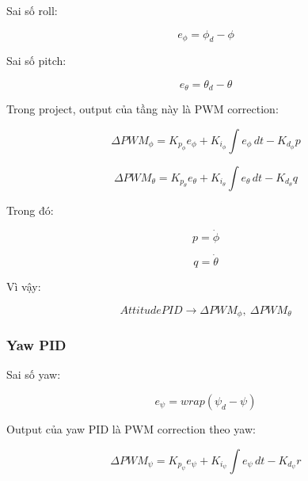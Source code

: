 Sai số roll:

\begin{equation}
    e_\phi = \phi_d - \phi
\end{equation}

Sai số pitch:

\begin{equation}
    e_\theta = \theta_d - \theta
\end{equation}

Trong project, output của tầng này là PWM correction:

\begin{equation}
    \Delta PWM_\phi
    =
    K_{p_\phi}e_\phi
    +
    K_{i_\phi}\int e_\phi\,dt
    -
    K_{d_\phi}p
\end{equation}

\begin{equation}
    \Delta PWM_\theta
    =
    K_{p_\theta}e_\theta
    +
    K_{i_\theta}\int e_\theta\,dt
    -
    K_{d_\theta}q
\end{equation}

Trong đó:

\begin{equation}
    p = \dot{\phi}
\end{equation}

\begin{equation}
    q = \dot{\theta}
\end{equation}

Vì vậy:

\begin{equation}
    \boxed{
    AttitudePID
    \longrightarrow
    \Delta PWM_\phi,\ \Delta PWM_\theta
    }
\end{equation}

\subsubsection{Yaw PID}

Sai số yaw:

\begin{equation}
    e_\psi = wrap(\psi_d - \psi)
\end{equation}

Output của yaw PID là PWM correction theo yaw:

\begin{equation}
    \Delta PWM_\psi
    =
    K_{p_\psi}e_\psi
    +
    K_{i_\psi}\int e_\psi\,dt
    -
    K_{d_\psi}r
\end{equation}

